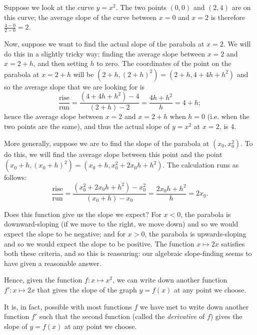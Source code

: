 \begin{ex}
  Suppose we look at the curve $ y = x^2 $. The two points $ (0,0) $ and $ (2,4) $ are on this curve; the average slope
  of the curve between $ x= 0 $ and $ x = 2 $ is therefore $ \frac{4 - 0}{2 - 0} = 2 $.

  Now, suppose we want to find the actual slope of the parabola at $ x = 2 $. We will do this in a slightly tricky way:
  finding the average slope between $ x = 2 $ and $ x = 2 + h $, and then setting $ h $ to zero. The coordinates of the
  point on the parabola at $ x = 2 + h $ will be $ (2 + h, (2 + h)^2) = (2 + h, 4 + 4h + h^2) $ and so the average slope
  that we are looking for is
  \begin{displaymath}
    \frac{\text{rise}}{\text{run}} = \frac{(4 + 4h + h^2) - 4}{(2 + h) - 2} = \frac{4h + h^2}{h} = 4 + h;
  \end{displaymath}
  hence the average slope between $ x = 2 $ and $ x = 2 + h $ when $ h = 0 $ (i.e. when the two points are the same),
  and thus the actual slope of $ y = x^2 $ at $ x = 2 $, is 4.

  More generally, suppose we are to find the slope of the parabola at $ (x_0, x_0^2) $. To do this, we will find
  the average slope between this point and the point $ (x_0 + h, (x_0 + h)^2) = (x_0 + h, x_0^2 + 2x_0 h + h^2) $.
  The calculation runs as follows:
  \begin{displaymath}
    \frac{\text{rise}}{\text{run}} = \frac{(x_0^2 + 2x_0 h + h^2) - x_0^2}{(x_0 + h) - x_0} = \frac{2x_0 h + h^2}{h} = 2x_0.
  \end{displaymath}

  Does this function give us the slope we expect? For $ x < 0 $, the parabola is downward-sloping (if we move to the right,
  we move down) and so we would expect the slope to be negative; and for $ x > 0 $, the parabola is upwards-sloping and
  so we would expect the slope to be positive. The function $ x \mapsto 2x $ satisfies both these criteria, and so this is
  reassuring: our algebraic slope-finding seems to have given a reasonable answer.

  Hence, given the function $ f : x \mapsto x^2 $, we can write down another function $ f' : x \mapsto 2x $ that gives the
  slope of the graph $ y = f(x) $ at any point we choose.
\end{ex}

It is, in fact, possible with most functions $ f $ we have met to write down another function $ f' $ such that the second
function (called the \emph{derivative} of $ f $) gives the slope of $ y = f(x) $ at any point we choose.

